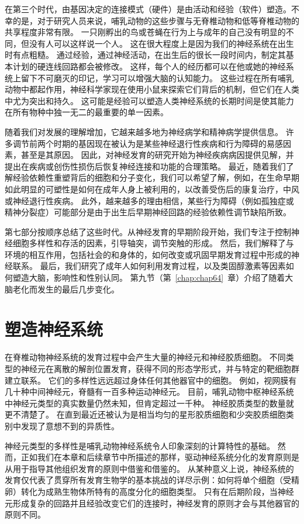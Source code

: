 在第三个时代，由基因决定的连接模式（硬件）是由活动和经验（软件）塑造。不幸的是，对于研究人员来说，哺乳动物的这些步骤与无脊椎动物和低等脊椎动物的共享程度非常有限。
一只刚孵出的鸟或苍蝇在行为上与成年的自己没有明显的不同，但没有人可以这样说一个人。
这在很大程度上是因为我们的神经系统在出生时有点粗糙。
通过经验，通过神经活动，在出生后的很长一段时间内，制定其基本计划的硬连线回路都会被修改。
这样，每个人的经历都可以在他或她的神经系统上留下不可磨灭的印记，学习可以增强大脑的认知能力。
这些过程在所有哺乳动物中都起作用，神经科学家现在使用小鼠来探索它们背后的机制，但它们在人类中尤为突出和持久。
这可能是经验可以塑造人类神经系统的长期时间是使其能力在所有物种中独一无二的最重要的单一因素。


随着我们对发展的理解增加，它越来越多地为神经病学和精神病学提供信息。
许多调节前两个时期的基因现在被认为是某些神经退行性疾病和行为障碍的易感因素，甚至是其原因。
因此，对神经发育的研究开始为神经疾病病因提供见解，并提出在疾病或创伤性损伤后恢复神经连接和功能的合理策略。
最近，随着我们了解经验依赖性重塑背后的细胞和分子变化，我们可以希望了解，例如，在生命早期如此明显的可塑性是如何在成年人身上被利用的，以改善受伤后的康复治疗，中风或神经退行性疾病。
此外，越来越多的理由相信，某些行为障碍（例如孤独症或精神分裂症）可能部分是由于出生后早期神经回路的经验依赖性调节缺陷所致。


第七部分按顺序总结了这些时代。从神经发育的早期阶段开始，我们专注于控制神经细胞多样性和存活的因素，引导轴突，调节突触的形成。
然后，我们解释了与环境的相互作用，包括社会的和身体的，如何改变或巩固早期发育过程中形成的神经联系。
最后，我们研究了成年人如何利用发育过程，以及类固醇激素等因素如何塑造大脑，影响性和性别认同。
第九节（第~\ref{chap:chap64}~章）介绍了随着大脑老化而发生的最后几步变化。



\chapter{塑造神经系统} \label{chap:chap45}

在脊椎动物神经系统的发育过程中会产生大量的神经元和神经胶质细胞。
不同类型的神经元在离散的解剖位置发育，获得不同的形态学形式，并与特定的靶细胞群建立联系。
它们的多样性远远超过身体任何其他器官中的细胞。
例如，视网膜有几十种中间神经元，脊髓有一百多种运动神经元。
目前，哺乳动物中枢神经系统中神经元类型的真实数量仍然未知，但肯定超过一千种。
神经胶质类型的数量就更不清楚了。
在直到最近还被认为是相当均匀的星形胶质细胞和少突胶质细胞类别中发现了意想不到的异质性。


神经元类型的多样性是哺乳动物神经系统令人印象深刻的计算特性的基础。
然而，正如我们在本章和后续章节中所描述的那样，驱动神经系统分化的发育原则是从用于指导其他组织发育的原则中借鉴和借鉴的。
从某种意义上说，神经系统的发育仅代表了贯穿所有发育生物学的基本挑战的详尽示例：如何将单个细胞（受精卵）转化为成熟生物体所特有的高度分化的细胞类型。
只有在后期阶段，当神经元形成复杂的回路并且经验改变它们的连接时，神经发育的原则才会与其他器官的原则不同。



